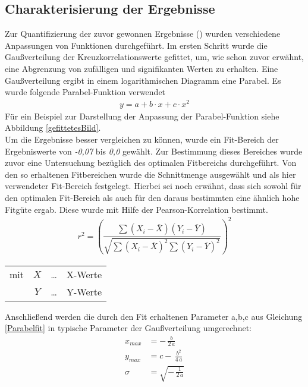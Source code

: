 \documentclass[fontsize=11pt, twoside, a4paper]{scrartcl}
\begin{document}
\subsection{Charakterisierung der Ergebnisse}
\label{sec:St9}
Zur Quantifizierung der zuvor gewonnen Ergebnisse () wurden verschiedene Anpassungen von Funktionen durchgeführt. Im ersten Schritt wurde die Gaußverteilung der Kreuzkorrelationswerte gefittet, um, wie schon zuvor erwähnt, eine Abgrenzung von zufälligen und signifikanten Werten zu erhalten. Eine Gaußverteilung ergibt in einem logarithmischen Diagramm eine Parabel. Es wurde folgende Parabel-Funktion verwendet
\begin{align}
y = a + b \cdot x + c \cdot x^{2}
\label{Parabelfit}
\end{align}
Für ein Beispiel zur Darstellung der Anpassung der Parabel-Funktion siehe Abbildung \ref{gefittetesBild}.\\
Um die Ergebnisse besser vergleichen zu können, wurde ein Fit-Bereich der Ergebniswerte von \textit{-0,07} bis \textit{0,0} gewählt. Zur Bestimmung dieses Bereiches wurde zuvor eine Untersuchung bezüglich des optimalen Fitbereichs durchgeführt. Von den so erhaltenen Fitbereichen wurde die Schnittmenge ausgewählt und als hier verwendeter Fit-Bereich festgelegt. Hierbei sei noch erwähnt, dass sich sowohl für den optimalen Fit-Bereich als auch für den daraus bestimmten eine ähnlich hohe Fitgüte ergab. Diese wurde mit Hilfe der Pearson-Korrelation \cite{Pearson} bestimmt.
\begin{align}
r^{2} = \left(\dfrac{\sum (X_{i} - \overline{X}) (Y_{i} - \overline{Y})}{\sqrt{\sum (X_{i} - \overline{X})^{2} \sum (Y_{i} - \overline{Y})^{2}}}\right)^{2}
\end{align}
\begin{table}[H]
\begin{tabular}{rccl}
mit  & $X$ & \ldots & X-Werte\\
	 & $Y$ & \ldots & Y-Werte\\
\end{tabular}
\end{table}
Anschließend werden die durch den Fit erhaltenen Parameter a,b,c aus Gleichung \ref{Parabelfit} in typische Parameter der Gaußverteilung umgerechnet:
\begin{align}
	x_{max} &= - \, \frac{b}{2\,a}\\
	y_{max} &= c - \, \frac{b^{2}}{4 \, a}\\
	\sigma &= \sqrt{-\,\frac{1}{2 \, a}}
\end{align}
\end{document}
